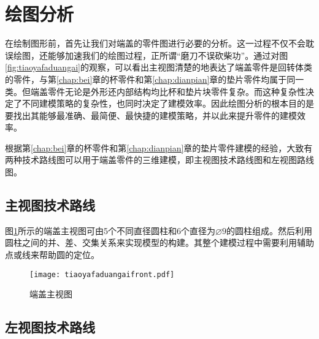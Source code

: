 \section{绘图分析}
在绘制图形前，首先让我们对端盖的零件图进行必要的分析。这一过程不仅不会耽误绘图，还能够加速我们的绘图过程，正所谓“磨刀不误砍柴功”。通过对图\ref{fig:tiaoyafaduangai}的观察，可以看出主视图清楚的地表达了端盖零件是回转体类的零件，与第\ref{chap:bei}章的杯零件和第\ref{chap:dianpian}章的垫片零件均属于同一类。但端盖零件无论是外形还内部结构均比杯和垫片块零件复杂。而这种复杂性决定了不同建模策略的复杂性，也同时决定了建模效率。因此绘图分析的根本目的是要找出其能够最准确、最简便、最快捷的建模策略，并以此来提升零件的建模效率。

根据第\ref{chap:bei}章的杯零件和第\ref{chap:dianpian}章的垫片零件建模的经验，大致有两种技术路线图可以用于端盖零件的三维建模，即主视图技术路线图和左视图路线图。

\subsection{主视图技术路线}
图\ref{fig:tiaoyafaduangaifront}所示的端盖主视图可由5个不同直径圆柱和6个直径为$\diameter 9$的圆柱组成。然后利用圆柱之间的并、差、交集关系来实现模型的构建。其整个建模过程中需要利用辅助点或线来帮助圆的定位。
\begin{figure}[htbp]
\centering
\texttt{[image: tiaoyafaduangaifront.pdf]}
\caption{端盖主视图}\label{fig:tiaoyafaduangaifront}
\end{figure}
\subsection{左视图技术路线}

\endinput